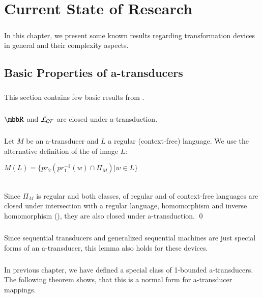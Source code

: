 \chapter{Current State of Research}
\label{chap:currentState}

\paragraph{}
In this chapter, we present some known results regarding transformation devices in general and their complexity aspects.

\section{Basic Properties of a-transducers}
\paragraph{}
This section contains few basic results from \cite{gin:AATPFL}.

\paragraph{}
\clema $\R $ and $\CF $ are closed under a-transduction.

\paragraph{}
\dokaz Let $M$ be an a-transducer and $L$ a regular (context-free) language. We use the alternative definition of the of image $L$:\\
\centerline{$M(L) = \{ pr_{2}(pr_{1}^{-1}(w) \cap \Pi_{M}) | w \in L \}$} \\
Since $\Pi_{M}$ is regular and both classes, of regular and of context-free languages are closed under intersection with a regular language, homomorphism and inverse homomorphism (\cite{hopcroft:fola}), they are also closed under a-transduction. \qed

\paragraph{}
\cdosledok Since sequential transducers and generalized sequential machines are just special forms of an a-transducer, this lemma also holds for these devices.

\paragraph{}
In previous chapter, we have defined a special class of 1-bounded a-transducers. The following theorem shows, that this is a normal form for a-transducer mappings.

